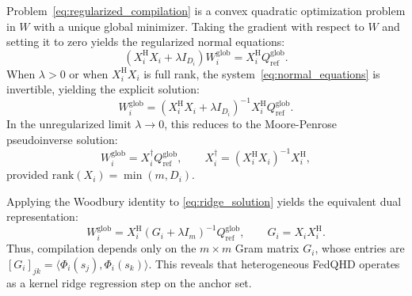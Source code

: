 Problem~\eqref{eq:regularized_compilation} is a convex quadratic optimization problem in $W$ with a unique global minimizer. Taking the gradient with respect to $W$ and setting it to zero yields the regularized normal equations:
\begin{equation}
\left(X_i^\mathrm{H} X_i + \lambda I_{D_i}\right) W^{\mathrm{glob}}_i = X_i^\mathrm{H} Q^{\mathrm{glob}}_{\mathrm{ref}}.
\label{eq:normal_equations}
\end{equation}
When $\lambda > 0$ or when $X_i^\mathrm{H} X_i$ is full rank, the system~\eqref{eq:normal_equations} is invertible, yielding the explicit solution:
\begin{equation}
W^{\mathrm{glob}}_i = \left(X_i^\mathrm{H} X_i + \lambda I_{D_i}\right)^{-1} X_i^\mathrm{H} Q^{\mathrm{glob}}_{\mathrm{ref}}.
\label{eq:ridge_solution}
\end{equation}
In the unregularized limit $\lambda \to 0$, this reduces to the Moore-Penrose pseudoinverse solution:
\begin{equation}
W^{\mathrm{glob}}_i = X_i^\dagger Q^{\mathrm{glob}}_{\mathrm{ref}},
\qquad X_i^\dagger = (X_i^\mathrm{H} X_i)^{-1} X_i^\mathrm{H},
\label{eq:pseudoinverse_solution}
\end{equation}
provided $\mathrm{rank}(X_i) = \min(m, D_i)$.



Applying the Woodbury identity to
\eqref{eq:ridge_solution} yields the equivalent
dual representation:
\begin{equation}
W^{\mathrm{glob}}_i
=
X_i^{\mathrm H}
(G_i + \lambda I_m)^{-1}
Q^{\mathrm{glob}}_{\mathrm{ref}},
\qquad
G_i = X_i X_i^{\mathrm H}.
\label{eq:dual_ridge}
\end{equation}
Thus, compilation depends only on the
$m \times m$ Gram matrix $G_i$,
whose entries are
$[G_i]_{jk}
=
\langle \Phi_i(s_j), \Phi_i(s_k)\rangle$.
This reveals that heterogeneous FedQHD
operates as a kernel ridge regression step
on the anchor set.

